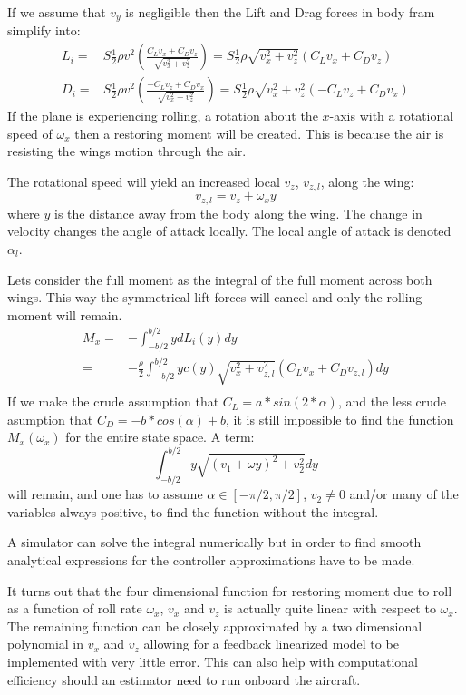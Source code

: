 If we assume that $v_y$ is negligible then the Lift and Drag forces in body fram simplify into:
\begin{equation}\begin{split}
    L_i =& 
     S \frac{1}{2} \rho v^2 \left( \frac{C_L v_x + C_D v_z}{\sqrt{v_x^2 + v_z^2}} \right) = 
      S \frac{1}{2} \rho \sqrt{v_x^2 + v_z^2} \left(C_L v_x + C_D v_z \right)\\
    D_i =& 
     S \frac{1}{2} \rho v^2 \left( \frac{-C_L v_z + C_D v_x}{ \sqrt{v_x^2 + v_z^2}} \right)
     = S \frac{1}{2} \rho \sqrt{v_x^2 + v_z^2} \left(-C_L v_z + C_D v_x\right)
     \label{liftdragbody}
\end{split}\end{equation}
If the plane is experiencing rolling, a rotation about the $x$-axis with a rotational speed of $\omega_x$ then a restoring moment will be created.
This is because the air is resisting the wings motion through the air.

The rotational speed will yield an increased local $v_z$, $v_{z,l}$, along the wing:
\begin{equation}
    v_{z, l} = v_z + \omega_x y
\end{equation}
where $y$ is the distance away from the body along the wing.
The change in velocity changes the angle of attack locally.
The local angle of attack is denoted $\alpha_l$.

Lets consider the full moment as the integral of the full moment across both wings.
This way the symmetrical lift forces will cancel and only the rolling moment will remain.
\begin{equation}\begin{split}
    M_x =& -\int_{-b/2}^{b/2} y dL_i(y) dy \\
    =& -\frac{\rho}{2}\int_{-b/2}^{b/2} y c(y) \sqrt{v_x^2 + v_{z,l}^2} \left(C_L v_x + C_D v_{z,l} \right) dy \\
\end{split}\end{equation}
If we make the crude assumption that $C_L = a * sin(2*\alpha)$, and the less crude asumption that $C_D = -b * cos(\alpha) + b$, it is still impossible to find the function $M_x(\omega_x)$ for the entire state space.
A term:
\begin{equation}
    \int_{-b/2}^{b/2} y \sqrt{(v_1 + \omega y)^2 + v_2^2} dy
\end{equation}
will remain, and one has to assume $\alpha \in [-\pi/2, \pi/2]$, $v_2 \neq 0$ and/or many of the variables always positive, to find the function without the integral.

A simulator can solve the integral numerically but in order to find smooth analytical expressions for the controller approximations have to be made.

It turns out that the four dimensional function for restoring moment due to roll as a function of roll rate $\omega_x$, $v_x$ and $v_z$ is actually quite linear with respect to $\omega_x$.
The remaining function can be closely approximated by a two dimensional polynomial in $v_x$ and $v_z$ allowing for a feedback linearized model to be implemented with very little error.
This can also help with computational efficiency should an estimator need to run onboard the aircraft.